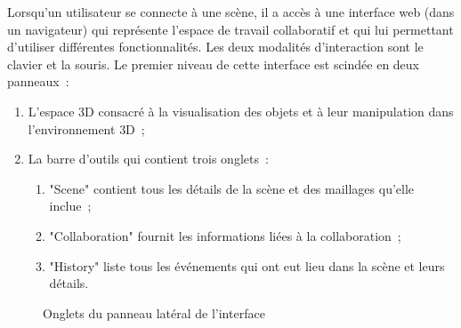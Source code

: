 %	
%	
%	
%	
%	
%	
%	
Lorsqu'un utilisateur se connecte à une scène, il a accès à une interface web 
(dans un navigateur) qui représente l'espace de travail collaboratif et qui lui 
permettant 
d'utiliser différentes fonctionnalités. Les deux modalités d'interaction sont le clavier 
et la souris. Le premier niveau de cette 
interface est scindée en deux panneaux~: 
\begin{enumerate}
	\item L'espace \gls{3D} consacré à la visualisation des objets et à leur 
	manipulation 
	dans l'environnement \gls{3D}~;
	\item La barre d'outils qui contient trois onglets~:~
	\begin{enumerate}
		\item "Scene" contient tous les détails de la scène et des maillages qu'elle 
		inclue~; 
		\item "Collaboration" fournit les informations liées à la collaboration~;
		\item "History" liste tous les événements qui ont eut lieu dans la scène et 
		leurs  détails. 
	\end{enumerate}
\end{enumerate}

\begin{figure}[]
	\centering
	\begingroup
	
	\hfill
	\hfill
	
	\endgroup
	\caption{Onglets du panneau latéral de l'interface}
	\label{fig:uipanneau}
\end{figure}

